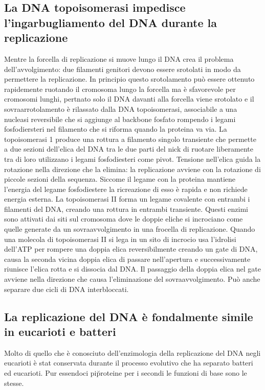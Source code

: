 \subsection{La DNA topoisomerasi impedisce l'ingarbugliamento del DNA durante la replicazione}
Mentre la forcella di replicazione si muove lungo il DNA crea il problema dell'avvolgimento: due filamenti genitori devono essere srotolati in modo da permettere la replicazione. In 
principio questo srotolamento pu\`o essere ottenuto rapidemente ruotando il cromosoma lungo la forcella ma \`e sfavorevole per cromosomi lunghi, pertnato solo il DNA davanti alla 
forcella viene srotolato e il sovraarrotolamento \`e rilassato dalla DNA topoisomerasi, associabile a una nucleasi reversibile che si aggiunge al backbone fosfato rompendo i legami
fosfodiersteri nel filamento che si riforma quando la proteina va via. La topoisomerasi 1 produce una rottura a filamento singolo transiente che permette a due sezioni dell'elica del DNA
tra le due parti del nick di ruotare liberamente tra di loro utilizzano i legami fosfodiesteri come pivot. Tensione nell'elica guida la rotazione nella direzione che la elimina: la
replicazione avviene con la rotazione di piccole sezioni della sequenza. Siccome il legame con la proteina mantiene l'energia del legame fosfodiestere la ricreazione di esso \`e rapida
e non richiede energia esterna. La topoisomerasi II forma un legame covalente con entrambi i filamenti del DNA, creando una rottura in entrambi transiente. Questi enzimi sono attivati 
dai siti sul cromosoma dove le doppie eliche si incrociano come quelle generate da un sovraavvolgimento in una frocella di replicazione. Quando una molecola di topoisomerasi II si lega 
in un sito di incrocio usa l'idrolisi dell'ATP per rompere una doppia elica reversibilmente creando un gate di DNA, causa la seconda vicina doppia elica di passare nell'apertura e 
successivamente riunisce l'elica rotta e si dissocia dal DNA. Il passaggio della doppia elica nel gate avviene nella direzione che causa l'eliminazione del sovraavvolgimento. Pu\`o 
anche separare due cicli di DNA interbloccati. 
\subsection{La replicazione del DNA \`e fondalmente simile in eucarioti e batteri}
Molto di quello che \`e conosciuto dell'enzimologia della replicazione del DNA negli eucarioti  \`e stat conservata durante il processo evolutivo che ha separato batteri ed eucarioti. 
Pur essendoci pi\u proteine per i secondi le funzioni di base sono le stesse. 
